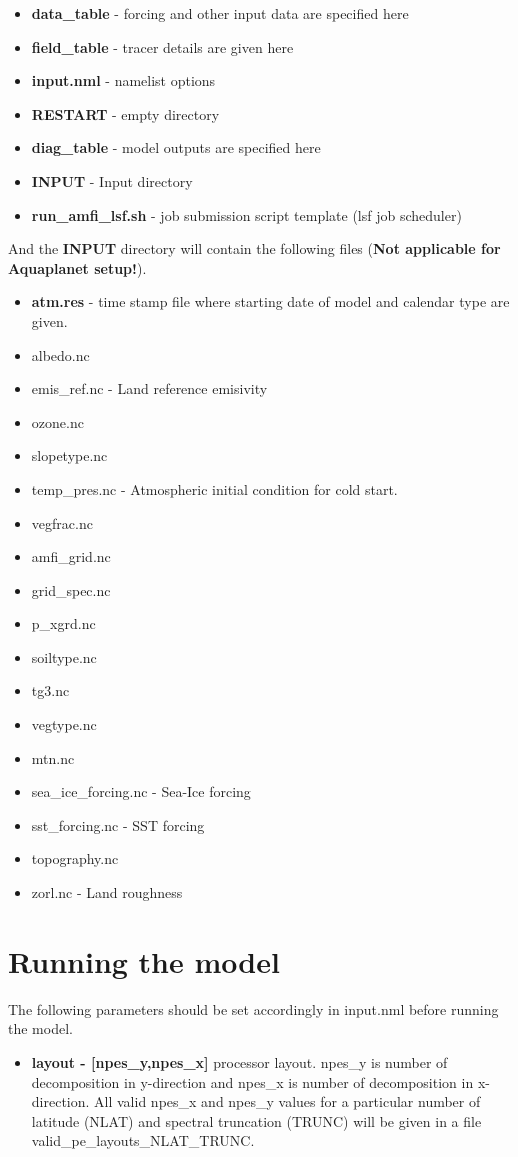\documentclass{article}
\begin{document}
\begin{itemize}
    \item \textbf{data\_table} - forcing and other input data are specified here
    \item \textbf{field\_table} - tracer details are given here
    \item \textbf{input.nml} - namelist options
    \item \textbf{RESTART} - empty directory
    \item \textbf{diag\_table} - model outputs are specified here
    \item \textbf{INPUT} - Input directory
    \item \textbf{run\_amfi\_lsf.sh} - job submission script template (lsf job scheduler)
\end{itemize}
And the \textbf{INPUT} directory will contain the following files (\textbf{Not applicable for Aquaplanet setup!}).
\begin{itemize}
    \item \textbf{atm.res} - time stamp file where starting date of model and calendar type are given.
    \item albedo.nc 
    \item emis\_ref.nc - Land reference emisivity 
    \item ozone.nc           
    \item slopetype.nc    
    \item temp\_pres.nc - Atmospheric initial condition for cold start.
    \item vegfrac.nc
    \item amfi\_grid.nc
    \item grid\_spec.nc  
    \item p\_xgrd.nc           
    \item soiltype.nc   
    \item tg3.nc         
    \item vegtype.nc
    \item mtn.nc
    \item sea\_ice\_forcing.nc - Sea-Ice forcing 
    \item sst\_forcing.nc - SST forcing
    \item topography.nc
    \item zorl.nc - Land roughness
\end{itemize}

\section{Running the model}
The following parameters should be set accordingly in input.nml before running the model.
\begin{itemize}
    \item \textbf{layout - [npes\_y,npes\_x]} processor layout. npes\_y is number of decomposition in y-direction and npes\_x is number of decomposition in x-direction. All valid npes\_x and npes\_y values for a particular number of latitude (NLAT) and spectral truncation (TRUNC) will be given in a file valid\_pe\_layouts\_NLAT\_TRUNC.
\end{itemize}
\end{document}
